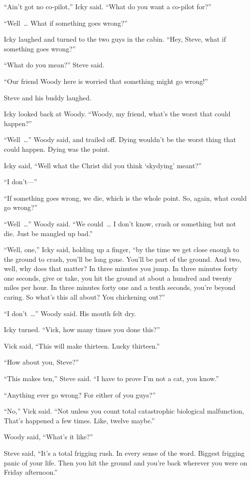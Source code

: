 “Ain’t got no co-pilot,” Icky said. “What do you want a co-pilot for?”

“Well~… What if something goes wrong?”

Icky laughed and turned to the two guys in the cabin. “Hey, Steve, what if something goes wrong?”

“What do you mean?” Steve said.

“Our friend Woody here is worried that something might go wrong!”

Steve and his buddy laughed.

Icky looked back at Woody. “Woody, my friend, what’s the worst that could happen?”

“Well~…” Woody said, and trailed off. Dying wouldn’t be the worst thing that could happen. Dying was the point.

Icky said, “Well what the Christ did you think ‘skydying’ meant?”

“I don’t—”

“If something goes wrong, we die, which is the whole point. So, again, what could go wrong?”

“Well~…” Woody said. “We could~… I don’t know, crash or something but not die. Just be mangled up bad.”

“Well, one,” Icky said, holding up a finger, “by the time we get close enough to the ground to crash, you’ll be long gone. You’ll be part of the ground. And two, well, why does that matter? In three minutes you jump. In three minutes forty one seconds, give or take, you hit the ground at about a hundred and twenty miles per hour. In three minutes forty one and a tenth seconds, you’re beyond caring. So what’s this all about? You chickening out?”

“I don’t~…” Woody said. His mouth felt dry.

Icky turned. “Vick, how many times you done this?”

Vick said, “This will make thirteen. Lucky thirteen.”

“How about you, Steve?”

“This makes ten,” Steve said. “I have to prove I’m not a cat, you know.”

“Anything ever go wrong? For either of you guys?”

“No,” Vick said. “Not unless you count total catastrophic biological malfunction, That’s happened a few times. Like, twelve maybe.”

Woody said, “What’s it like?”

Steve said, “It’s a total frigging rush. In every sense of the word. Biggest frigging panic of your life. Then you hit the ground and you’re back wherever you were on Friday afternoon.”

